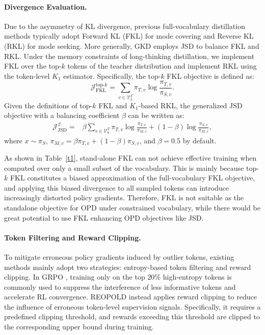 \documentclass{llmxive}
\providecommand{\cite}[1]{\citep{#1}}
\begin{document}
\paragraph{Divergence Evaluation.}
Due to the asymmetry of KL divergence, previous full-vocabulary distillation methods typically adopt Forward KL (FKL) for mode covering and Reverse KL (RKL) for mode seeking. More generally, GKD \cite{agarwal2024onpolicy} employs JSD to balance FKL and RKL. Under the memory constraints of long-thinking distillation, we implement FKL over the top-$k$ tokens of the teacher distribution and implement RKL using the token-level $K_1$ estimator. Specifically, the top-$k$ FKL objective is defined as:
\begin{equation}
    \mathcal{J}_{\mathrm{FKL}}^{\mathrm{top}\text{-}k}
    =
    \sum_{v \in \mathcal{V}^{T}_{k}}
    \pi_{T,v}
    \log
    \frac{\pi_{T,v}}{\pi_{S,v}} .
\end{equation}
Given the definitions of top-$k$ FKL and $K_1$-based RKL, 
the generalized JSD objective with a balancing coefficient $\beta$ 
can be written as:
\begin{equation}
\begin{aligned}
    \mathcal{J}_{\mathrm{JSD}}^{\beta}
    =
    {}&
    \beta
    \sum_{v \in \mathcal{V}^{T}_{k}}
    \pi_{T,v}
    \log
    \frac{\pi_{T,v}}{\pi_{M,v}}
    +
    (1-\beta)
    \log
    \frac{\pi_{S,x}}{\pi_{M,x}},
\end{aligned}
\end{equation}
where $x \sim \pi_S$, 
$\pi_{M,v} = \beta \pi_{T,v} + (1-\beta)\pi_{S,v}$, 
and $\beta=0.5$ by default.

As shown in Table~\ref{t1}, stand-alone FKL can not achieve effective training when computed over only a small subset of the vocabulary. This is mainly because top-$k$ FKL constitutes a biased approximation of the full-vocabulary FKL objective, and applying this biased divergence to all sampled tokens can introduce increasingly distorted policy gradients. Therefore, FKL is not suitable as the standalone objective for OPD under constrained vocabulary, while there would be great potential to use FKL enhancing OPD objectives like JSD.


\paragraph{Token Filtering and Reward Clipping.}
To mitigate erroneous policy gradients induced by outlier tokens, existing methods mainly adopt two strategies: entropy-based token filtering and reward clipping. In GRPO \cite{shao2024deepseekmath}, training only on the top $20\%$ high-entropy tokens is commonly used to suppress the interference of less informative tokens and accelerate RL convergence. REOPOLD \cite{ko2026scaling} instead applies reward clipping to reduce the influence of erroneous token-level supervision signals. Specifically, it requires a predefined clipping threshold, and rewards exceeding this threshold are clipped to the corresponding upper bound during training.
\end{document}
